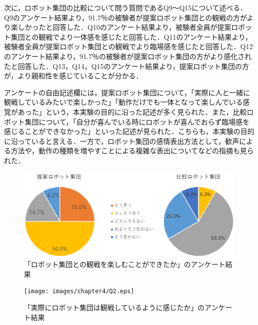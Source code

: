 次に，ロボット集団の比較について問う質問であるQ9～Q15について述べる．Q9のアンケート結果より，91.7％の被験者が提案ロボット集団との観戦の方がより楽しかったと回答した．Q10のアンケート結果より，被験者全員が提案ロボット集団との観戦でより一体感を感じたと回答した．Q11のアンケート結果より，被験者全員が提案ロボット集団との観戦でより臨場感を感じたと回答した．Q12のアンケート結果より，91.7％の被験者が提案ロボット集団の方がより感化されたと回答した．Q13，Q14，Q15のアンケート結果より，提案ロボット集団の方が，より親和性を感じていることが分かる．

アンケートの自由記述欄には，提案ロボット集団について，「実際に人と一緒に観戦しているみたいで楽しかった」「動作だけでも一体となって楽しんでいる感覚があった」という，本実験の目的に沿った記述が多く見られた．また，比較ロボット集団について，「自分が喜んでいる時にロボットが喜んでおらず臨場感を感じることができなかった」といった記述が見られた．こちらも，本実験の目的に沿っていると言える．一方で，ロボット集団の感情表出方法として，歓声による方法や，動作の種類を増やすことによる複雑な表出についてなどの指摘も見られた．


\newpage

\begin{figure}[!h]
 \begin{center}
\vspace{3cm}
  \centering
  \includegraphics[width=15cm]{images/chapter4/Q1.eps}
  \caption{「ロボット集団との観戦を楽しむことができたか」のアンケート結果}
  \label{Q1}
 \end{center}
\end{figure}



\begin{figure}[!h]
 \begin{center}
\vspace{3cm}
  \centering
  \texttt{[image: images/chapter4/Q2.eps]}
  \caption{「実際にロボット集団は観戦しているように感じたか」のアンケート結果}
  \label{Q2}
 \end{center}
\end{figure}



